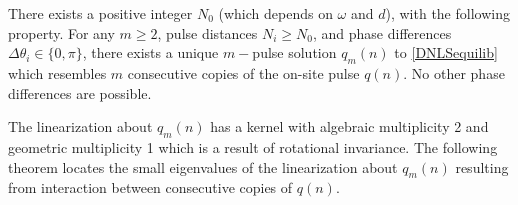 \documentclass[thesis.tex]{subfiles}
\begin{document}
\begin{theorem}\label{DNLSexisttheorem}
There exists a positive integer $N_0$ (which depends on $\omega$ and $d$), with the following property. For any $m \geq 2$, pulse distances $N_i \geq N_0$, and phase differences $\Delta\theta_i \in \{0, \pi\}$, there exists a unique $m-$pulse solution $q_m(n)$ to \cref{DNLSequilib} which resembles $m$ consecutive copies of the on-site pulse $q(n)$. No other phase differences are possible.
\end{theorem}

The linearization about $q_m(n)$ has a kernel with algebraic multiplicity 2 and geometric multiplicity 1 which is a result of rotational invariance. The following theorem locates the small eigenvalues of the linearization about $q_m(n)$ resulting from interaction between consecutive copies of $q(n)$. 
\end{document}
